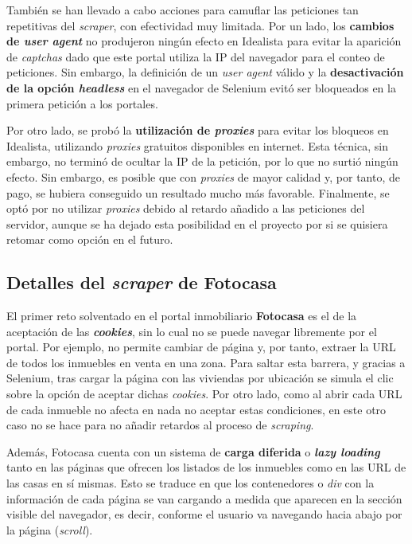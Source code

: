 \documentclass[12pt]{article}
\begin{document}
También se han llevado a cabo acciones para camuflar las peticiones tan repetitivas del \textit{scraper}, con efectividad muy limitada. Por un lado, los \textbf{cambios de \textit{user agent}} no produjeron ningún efecto en Idealista para evitar la aparición de \textit{captchas} dado que este portal utiliza la IP del navegador para el conteo de peticiones. Sin embargo, la definición de un \textit{user agent} válido y la \textbf{desactivación de la opción \textit{headless}} en el navegador de Selenium evitó ser bloqueados en la primera petición a los portales.

Por otro lado, se probó la \textbf{utilización de \textit{proxies}} para evitar los bloqueos en Idealista, utilizando \textit{proxies} gratuitos disponibles en internet. Esta técnica, sin embargo, no terminó de ocultar la IP de la petición, por lo que no surtió ningún efecto. Sin embargo, es posible que con \textit{proxies} de mayor calidad y, por tanto, de pago, se hubiera conseguido un resultado mucho más favorable. Finalmente, se optó por no utilizar \textit{proxies} debido al retardo añadido a las peticiones del servidor, aunque se ha dejado esta posibilidad en el proyecto por si se quisiera retomar como opción en el futuro.

\vspace{-1.5em}\subsection*{Detalles del \textit{scraper} de Fotocasa}\vspace{-1em}

El primer reto solventado en el portal inmobiliario \textbf{Fotocasa} es el de la aceptación de las \textit{\textbf{cookies}}, sin lo cual no se puede navegar libremente por el portal. Por ejemplo, no permite cambiar de página y, por tanto, extraer la URL de todos los inmuebles en venta en una zona. Para saltar esta barrera, y gracias a Selenium, tras cargar la página con las viviendas por ubicación se simula el clic sobre la opción de aceptar dichas \textit{cookies}. Por otro lado, como al abrir cada URL de cada inmueble no afecta en nada no aceptar estas condiciones, en este otro caso no se hace para no añadir retardos al proceso de \textit{scraping}.

Además, Fotocasa cuenta con un sistema de \textbf{carga diferida} o \textit{\textbf{lazy loading}} tanto en las páginas que ofrecen los listados de los inmuebles como en las URL de las casas en sí mismas. Esto se traduce en que los contenedores o \textit{div} con la información de cada página se van cargando a medida que aparecen en la sección visible del navegador, es decir, conforme el usuario va navegando hacia abajo por la página (\textit{scroll}).
\end{document}
